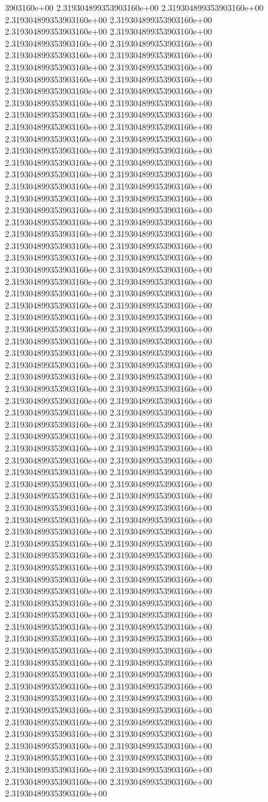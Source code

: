 3903160e+00	2.319304899353903160e+00	2.319304899353903160e+00	2.319304899353903160e+00	2.319304899353903160e+00	2.319304899353903160e+00	2.319304899353903160e+00	2.319304899353903160e+00	2.319304899353903160e+00	2.319304899353903160e+00	2.319304899353903160e+00	2.319304899353903160e+00	2.319304899353903160e+00	2.319304899353903160e+00	2.319304899353903160e+00	2.319304899353903160e+00	2.319304899353903160e+00	2.319304899353903160e+00	2.319304899353903160e+00	2.319304899353903160e+00	2.319304899353903160e+00	2.319304899353903160e+00	2.319304899353903160e+00	2.319304899353903160e+00	2.319304899353903160e+00	2.319304899353903160e+00	2.319304899353903160e+00	2.319304899353903160e+00	2.319304899353903160e+00	2.319304899353903160e+00	2.319304899353903160e+00	2.319304899353903160e+00	2.319304899353903160e+00	2.319304899353903160e+00	2.319304899353903160e+00	2.319304899353903160e+00	2.319304899353903160e+00	2.319304899353903160e+00	2.319304899353903160e+00	2.319304899353903160e+00	2.319304899353903160e+00	2.319304899353903160e+00	2.319304899353903160e+00	2.319304899353903160e+00	2.319304899353903160e+00	2.319304899353903160e+00	2.319304899353903160e+00	2.319304899353903160e+00	2.319304899353903160e+00	2.319304899353903160e+00	2.319304899353903160e+00	2.319304899353903160e+00	2.319304899353903160e+00	2.319304899353903160e+00	2.319304899353903160e+00	2.319304899353903160e+00	2.319304899353903160e+00	2.319304899353903160e+00	2.319304899353903160e+00	2.319304899353903160e+00	2.319304899353903160e+00	2.319304899353903160e+00	2.319304899353903160e+00	2.319304899353903160e+00	2.319304899353903160e+00	2.319304899353903160e+00	2.319304899353903160e+00	2.319304899353903160e+00	2.319304899353903160e+00	2.319304899353903160e+00	2.319304899353903160e+00	2.319304899353903160e+00	2.319304899353903160e+00	2.319304899353903160e+00	2.319304899353903160e+00	2.319304899353903160e+00	2.319304899353903160e+00	2.319304899353903160e+00	2.319304899353903160e+00	2.319304899353903160e+00	2.319304899353903160e+00	2.319304899353903160e+00	2.319304899353903160e+00	2.319304899353903160e+00	2.319304899353903160e+00	2.319304899353903160e+00	2.319304899353903160e+00	2.319304899353903160e+00	2.319304899353903160e+00	2.319304899353903160e+00	2.319304899353903160e+00	2.319304899353903160e+00	2.319304899353903160e+00	2.319304899353903160e+00	2.319304899353903160e+00	2.319304899353903160e+00	2.319304899353903160e+00	2.319304899353903160e+00	2.319304899353903160e+00	2.319304899353903160e+00	2.319304899353903160e+00	2.319304899353903160e+00	2.319304899353903160e+00	2.319304899353903160e+00	2.319304899353903160e+00	2.319304899353903160e+00	2.319304899353903160e+00	2.319304899353903160e+00	2.319304899353903160e+00	2.319304899353903160e+00	2.319304899353903160e+00	2.319304899353903160e+00	2.319304899353903160e+00	2.319304899353903160e+00	2.319304899353903160e+00	2.319304899353903160e+00	2.319304899353903160e+00	2.319304899353903160e+00	2.319304899353903160e+00	2.319304899353903160e+00	2.319304899353903160e+00	2.319304899353903160e+00	2.319304899353903160e+00	2.319304899353903160e+00	2.319304899353903160e+00	2.319304899353903160e+00	2.319304899353903160e+00	2.319304899353903160e+00	2.319304899353903160e+00	2.319304899353903160e+00	2.319304899353903160e+00	2.319304899353903160e+00	2.319304899353903160e+00	2.319304899353903160e+00